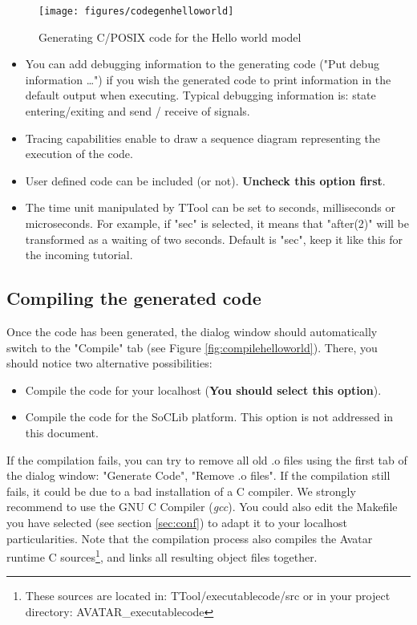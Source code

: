 \documentclass[12pt]{article}
\begin{document}
\begin{figure}[htbp]
\centering
\texttt{[image: figures/codegenhelloworld]}
\caption{Generating C/POSIX code for the Hello world model} \label{fig:codegenhelloworld}
\end{figure}

\begin{itemize}
\item You can add debugging information to the generating code ("Put debug information \ldots") if you wish the generated code to print information in the default output when executing. Typical debugging information is: state entering/exiting and send / receive of signals.
\item Tracing capabilities enable to draw a sequence diagram representing the execution of the code.
\item User defined code can be included (or not). \textbf{Uncheck this option first}.
\item The time unit manipulated by TTool can be set to seconds, milliseconds or microseconds. For example, if "sec" is selected, it means that  "after(2)" will be transformed as a waiting of two seconds. Default is "sec", keep it like this for the incoming tutorial.
\end{itemize}

\subsection{Compiling the generated code}
Once the code has been generated, the dialog window should automatically switch to the "Compile" tab (see Figure \ref{fig:compilehelloworld}). There, you should notice two alternative possibilities:
\begin{itemize}
\item Compile the code for your localhost (\textbf{You should select this option}).
\item Compile the code for the SoCLib platform. This option is not addressed in this document.
\end{itemize}
If the compilation fails, you can try to remove all old .o files using the first tab of the dialog window: "Generate Code", "Remove .o files". If the compilation still fails, it could be due to a bad installation of a C compiler. We strongly recommend to use the GNU C Compiler (\textit{gcc}). You could also edit the Makefile you have selected (see section \ref{sec:conf}) to adapt it to your localhost particularities.  Note that the compilation process also compiles the Avatar runtime C sources\footnote{These sources are located in: TTool/executablecode/src or in your project directory: AVATAR_executablecode}, and links all resulting object files together.
\end{document}
